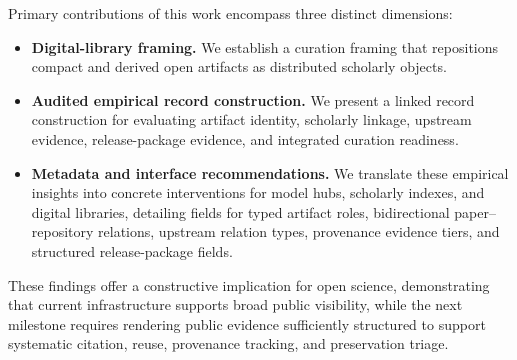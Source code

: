 Primary contributions of this work encompass three distinct dimensions:

\begin{itemize}[leftmargin=*]
    \item \textbf{Digital-library framing.} We establish a curation framing that repositions compact and derived open \llm artifacts as distributed scholarly objects.
    \item \textbf{Audited empirical record construction.} We present a linked record construction for evaluating artifact identity, scholarly linkage, upstream evidence, release-package evidence, and integrated curation readiness.
    \item \textbf{Metadata and interface recommendations.} We translate these empirical insights into concrete interventions for model hubs, scholarly indexes, and digital libraries, detailing fields for typed artifact roles, bidirectional paper--repository relations, upstream relation types, provenance evidence tiers, and structured release-package fields.
\end{itemize}

These findings offer a constructive implication for open science, demonstrating that current infrastructure supports broad public visibility, while the next milestone requires rendering public evidence sufficiently structured to support systematic citation, reuse, provenance tracking, and preservation triage.
